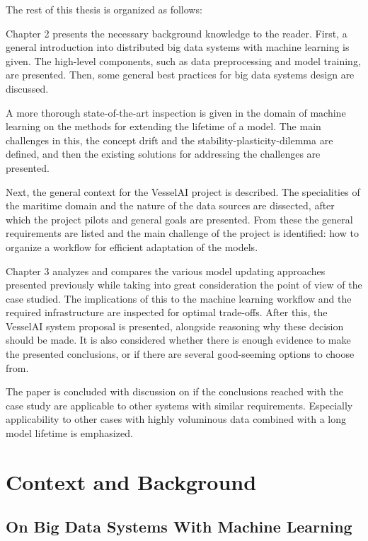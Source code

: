 The rest of this thesis is organized as follows:

Chapter 2 presents the necessary background knowledge to the reader. First, a general introduction into distributed big data systems with machine learning is given. The high-level components, such as data preprocessing and model training, are presented. Then, some general best practices for big data systems design are discussed.

A more thorough state-of-the-art inspection is given in the domain of machine learning on the methods for extending the lifetime of a model. The main challenges in this, the concept drift and the stability-plasticity-dilemma are defined, and then the existing solutions for addressing the challenges are presented.

Next, the general context for the VesselAI project is described. The specialities of the maritime domain and the nature of the data sources are dissected, after which the project pilots and general goals are presented. From these the general requirements are listed and the main challenge of the project is identified: how to organize a workflow for efficient adaptation of the models.

Chapter 3 analyzes and compares the various model updating approaches presented previously while taking into great consideration the point of view of the case studied. The implications of this to the machine learning workflow and the required infrastructure are inspected for optimal trade-offs. After this, the VesselAI system proposal is presented, alongside reasoning why these decision should be made. It is also considered whether there is enough evidence to make the presented conclusions, or if there are several good-seeming options to choose from.

The paper is concluded with discussion on if the conclusions reached with the case study are applicable to other systems with similar requirements. Especially applicability to other cases with highly voluminous data combined with a long model lifetime is emphasized.

\chapter{Context and Background}

\section{On Big Data Systems With Machine Learning}

